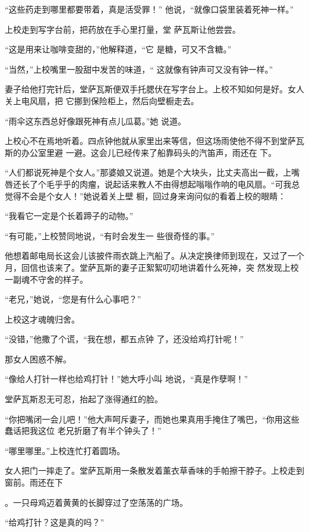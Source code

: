 \documentclass{article}
\begin{document}
\newpage

“这些药走到哪里都要带着，真是活受罪！”
他说，“就像口袋里装着死神一样。” 

上校走到写字台前，把药放在手心里打量，堂
萨瓦斯让他尝尝。 

“这是用来让咖啡变甜的，”他解释道，“它
是糖，可又不含糖。” 

“当然，”上校嘴里一股甜中发苦的味道，“
这就像有钟声可又没有钟一样。” 

妻子给他打完针后，堂萨瓦斯便双手托腮伏在写字台上。上校不知如何是好。女人关上电风扇，把
它挪到保险柜上，然后向壁橱走去。 

“雨伞这东西总好像跟死神有点儿瓜葛。”她
说道。 

上校心不在焉地听着。四点钟他就从家里出来等信，但这场雨使他不得不到堂萨瓦斯的办公室里避
\newpage
一避。这会儿已经传来了船靠码头的汽笛声，雨还在
下。 

“人们都说死神是个女人。”那婆娘又说道。她是个大块头，比丈夫高出一截，上嘴唇还长了个毛乎乎的肉瘤，说起话来教人不由得想起嗡嗡作响的电风扇。“可我总觉得不会是个女人！”她说着关上壁
橱，回过身来询问似的看着上校的眼睛： 


“我看它一定是个长着蹄子的动物。” 

“有可能，”上校赞同地说，“有时会发生一
些很奇怪的事。” 

他想着邮电局长这会儿该披件雨衣跳上汽船了。从决定换律师到现在，又过了一个月，回信也该来了。堂萨瓦斯的妻子正絮絮叨叨地讲着什么死神，突
然发现上校一副魂不守舍的样子。 


“老兄，”她说，“您是有什么心事吧？” 

\newpage


上校这才魂魄归舍。 

“没错，”他撒了个谎，“我在想，都五点钟
了，还没给鸡打针呢！” 


那女人困惑不解。 

“像给人打针一样也给鸡打针！”她大呼小叫
地说，“真是作孽啊！” 


堂萨瓦斯忍无可忍，抬起了涨得通红的脸。 

“你把嘴闭一会儿吧！”他大声呵斥妻子，而她也果真用手掩住了嘴巴，“你用这些蠢话把我这位
老兄折磨了有半个钟头了！” 


“哪里哪里。”上校连忙打着圆场。 

女人把门一摔走了。堂萨瓦斯用一条散发着薰衣草香味的手帕擦干脖子。上校走到窗前。雨还在下

\newpage
。一只母鸡迈着黄黄的长脚穿过了空荡荡的广场。 


“给鸡打针？这是真的吗？” 
\end{document}
